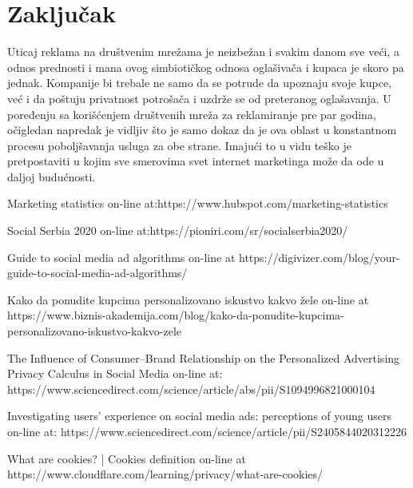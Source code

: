 \documentclass[a4paper]{article}
\begin{document}
	\section{Zaključak}
	\label{sec:zakljucak}
	Uticaj reklama na društvenim mrežama je neizbežan i svakim danom sve veći, a odnos prednosti i mana ovog simbiotičkog odnosa oglašivača i kupaca je skoro pa jednak.  Kompanije bi trebale ne samo da se potrude da upoznaju svoje kupce, već i da poštuju privatnost potrošača i uzdrže se od preteranog oglašavanja. U poređenju sa korišćenjem društvenih mreža za reklamiranje pre par godina, očigledan napredak je vidljiv što je samo dokaz da je ova oblast u konstantnom procesu poboljšavanja usluga za obe strane. Imajući to u vidu teško je pretpostaviti u kojim sve smerovima svet internet marketinga može da ode u daljoj budućnosti. 	

	\renewcommand{\refname}{Literatura}

	\newpage
	\appendix
	

	
	\begin{thebibliography}{9}
		
		 Marketing statistics on-line at:https://www.hubspot.com/marketing-statistics
		
		 Social Serbia 2020 on-line at:https://pioniri.com/sr/socialserbia2020/
		
			Guide to social media ad algorithms on-line at https://digivizer.com/blog/your-guide-to-social-media-ad-algorithms/ 
		
		 Kako da ponudite kupcima personalizovano iskustvo kakvo žele on-line at https://www.biznis-akademija.com/blog/kako-da-ponudite-kupcima-personalizovano-iskustvo-kakvo-zele
		
		 The Influence of Consumer–Brand Relationship on the Personalized Advertising Privacy Calculus in Social Media on-line at: https://www.sciencedirect.com/science/article/abs/pii/S1094996821000104        
		
		 Investigating users’ experience on social media ads: perceptions of young users on-line at: https://www.sciencedirect.com/science/article/pii/S2405844020312226
		
		 What are cookies? | Cookies definition on-line at https://www.cloudflare.com/learning/privacy/what-are-cookies/
		
		
	\end{thebibliography}
	
	\appendix
\end{document}
